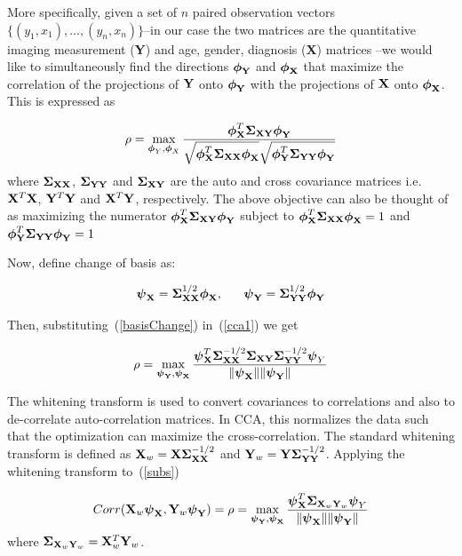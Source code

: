 \documentclass{llncs}
\newcommand{\X}{{\bf X}}
\newcommand{\Y}{{\bf Y}}
\newcommand{\bs}{\boldsymbol}
\begin{document}
More specifically, given a set of $n$ paired observation vectors
$\{(y_1,x_1),...,(y_n,x_n)\}$--in our case the two matrices are the
quantitative imaging measurement ({\Y}) and age, gender, diagnosis ({\X}) matrices --we would like to simultaneously find the directions
${\bs{\bs\phi_{\Y}}}$ and
${\bs{\bs\phi_{\X}}}$ that maximize the correlation of
the projections of ${\Y}$ onto ${\bs{\bs\phi_{\Y}}}$
with the projections of ${\X}$ onto
${\bs{\bs\phi_{\X}}}$. This is expressed as

\begin{equation}
\label{cca1}
\rho=\max_{{\bs\phi_Y}, {\bs\phi_X}}
\frac{{\bs\phi_{\X}^T\bs\Sigma_{\X\Y}}\bs\phi_{\Y}}{\sqrt{\bs\phi_{\X}^T\bs\Sigma_{\X\X}\bs\phi_{\X}}\sqrt{\bs\phi_{\Y}^T\bs\Sigma_{\Y\Y}\bs\phi_{\Y}}}
\end{equation}
where ${\bs\Sigma_{\X\X}}$, ${\bs\Sigma_{\Y\Y}}$ and ${\bs\Sigma_{\X\Y}}$ are the auto and cross covariance matrices i.e. $\X^T\X$, $\Y^T\Y$ and $\X^T\Y$, respectively. The above objective can also be thought of as maximizing the numerator $\bs\phi_{\X}^T\bs\Sigma_{\X\Y}\bs\phi_{\Y}$ subject to $\bs\phi_{\X}^T\bs\Sigma_{\X\X}\bs\phi_{\X} =1$ and $\bs\phi_{\Y}^T\bs\Sigma_{\Y\Y}\bs\phi_{\Y}=1$

Now, define change of basis as:

\begin{equation}
\label{basisChange}
\bs\psi_{\X} = \bs\Sigma_{\X\X}^{1/2}\bs\phi_{\X}, \;\;\;\;\;\;   \bs\psi_{\Y} = \bs\Sigma_{\Y\Y}^{1/2}\bs\phi_{\Y} 
\end{equation}

Then, substituting~(\ref{basisChange}) in~(\ref{cca1}) we get 

\begin{equation}
\label{subs}
\rho= \max_{{\bs\psi_{\Y}}, {\bs\psi_{\X}}} \frac{\bs\psi_{\X}^T \bs\Sigma_{\X\X}^{-1/2}\bs\Sigma_{\X\Y}\bs\Sigma_{\Y\Y}^{-1/2}\bs\psi_Y}{\|\bs\psi_{\X}\| \|\bs\psi_{\Y}\|}
\end{equation}

The whitening transform is used to convert covariances to correlations
and also to de-correlate auto-correlation matrices.  In CCA, this
normalizes the data such that the optimization can maximize the
cross-correlation.  The standard whitening transform is defined as
$\X_w= \X\bs\Sigma_{\X\X}^{-1/2}$ and $\Y_w=
\Y\bs\Sigma_{\Y\Y}^{-1/2}$.  Applying the whitening transform
to~(\ref{subs})

\begin{equation}
\label{simplifiedcca}
Corr(\X_w\bs\psi_{\X},\Y_w\bs\psi_{\Y})=\rho=\max_{{\bs\psi_{\Y}}, {\bs\psi_{\X}}} \frac{\bs\psi_{\X}^T \bs\Sigma_{\X_w\Y_w}\bs\psi_Y}{\|\bs\psi_{\X}\| \|\bs\psi_{\Y}\|}
\end{equation}
where $\bs\Sigma_{\X_w\Y_w} = \X_w^T\Y_w$. 
\end{document}
